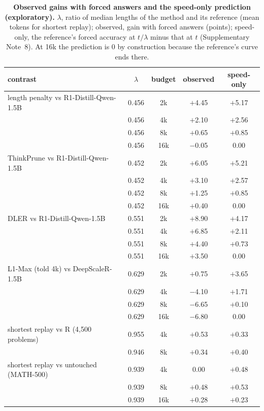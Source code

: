 \documentclass[10pt]{article}
\begin{document}
\begin{table}[h]
\centering\footnotesize
\caption{\textbf{Observed gains with forced answers and the speed-only prediction (exploratory).} $\lambda$, ratio of median lengths of the method and its reference (mean tokens for shortest replay); observed, gain with forced answers (points); speed-only, the reference's forced accuracy at $t/\lambda$ minus that at $t$ (Supplementary Note~8). At 16k the prediction is 0 by construction because the reference's curve ends there.}
\label{tab:speed}
\setlength{\tabcolsep}{5pt}
\begin{tabular}{lcccc}
\toprule
contrast & $\lambda$ & budget & observed & speed-only \\
\midrule
length penalty vs R1-Distill-Qwen-1.5B & 0.456 & 2k & $+$4.45 & $+$5.17 \\
 & 0.456 & 4k & $+$2.10 & $+$2.56 \\
 & 0.456 & 8k & $+$0.65 & $+$0.85 \\
 & 0.456 & 16k & $-$0.05 & 0.00 \\
\addlinespace
ThinkPrune vs R1-Distill-Qwen-1.5B & 0.452 & 2k & $+$6.05 & $+$5.21 \\
 & 0.452 & 4k & $+$3.10 & $+$2.57 \\
 & 0.452 & 8k & $+$1.25 & $+$0.85 \\
 & 0.452 & 16k & $+$0.40 & 0.00 \\
\addlinespace
DLER vs R1-Distill-Qwen-1.5B & 0.551 & 2k & $+$8.90 & $+$4.17 \\
 & 0.551 & 4k & $+$6.85 & $+$2.11 \\
 & 0.551 & 8k & $+$4.40 & $+$0.73 \\
 & 0.551 & 16k & $+$3.50 & 0.00 \\
\addlinespace
L1-Max (told 4k) vs DeepScaleR-1.5B & 0.629 & 2k & $+$0.75 & $+$3.65 \\
 & 0.629 & 4k & $-$4.10 & $+$1.71 \\
 & 0.629 & 8k & $-$6.65 & $+$0.10 \\
 & 0.629 & 16k & $-$6.80 & 0.00 \\
\addlinespace
shortest replay vs R (4,500 problems) & 0.955 & 4k & $+$0.53 & $+$0.33 \\
 & 0.946 & 8k & $+$0.34 & $+$0.40 \\
\addlinespace
shortest replay vs untouched (MATH-500) & 0.939 & 4k & 0.00 & $+$0.48 \\
 & 0.939 & 8k & $+$0.48 & $+$0.53 \\
 & 0.939 & 16k & $+$0.28 & $+$0.23 \\
\bottomrule
\end{tabular}
\end{table}
\end{document}
